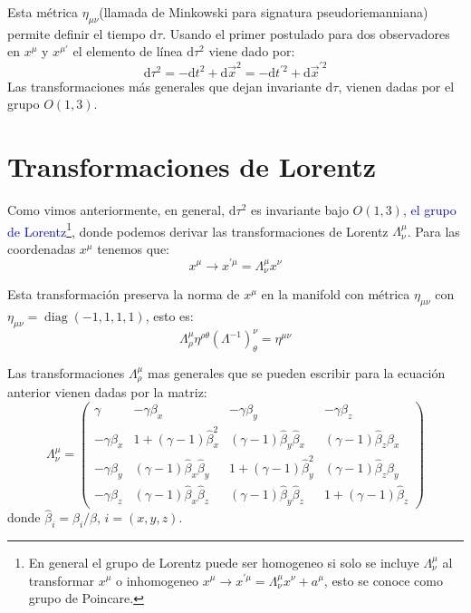 \documentclass[../main]{subfiles}
\begin{document}
\begin{adjustwidth}{0pt}{-100pt}
Esta métrica $\eta_{\mu\nu}$(llamada de Minkowski para signatura pseudoriemanniana) permite definir el tiempo $\mathrm{d}\tau$. Usando el primer postulado para dos observadores en $x^{\mu}$ y $x^{\mu'}$ el elemento de línea $\mathrm{d}\tau^2$ viene dado por:
\begin{equation}
    \mathrm{d}\tau^2=-\mathrm{d}t^2+\mathrm{d}\vec{x}^2=-\mathrm{d}t^{'2}+\mathrm{d}\vec{x}^{'2}
\end{equation}
Las transformaciones más generales que dejan invariante $\mathrm{d}\tau$, vienen dadas por el grupo $O(1, 3)$.

\section{Transformaciones de Lorentz}\label{part2.4}
Como vimos anteriormente, en general, $\mathrm{d}\tau^2$ es invariante bajo $O(1, 3)$, \textcolor{blue}{el grupo de Lorentz}\footnote{En general el grupo de Lorentz puede ser homogeneo si solo se incluye $\Lambda^{\mu}_\nu$ al transformar $x^{\mu}$ o inhomogeneo $x^{\mu} \rightarrow x^{'\mu}=\Lambda^{\mu}_{\nu}x^{\nu}+a^{\mu}$, esto se conoce como grupo de Poincare.}, donde podemos derivar las transformaciones de Lorentz $\Lambda^{\mu}_{\nu}$. Para las coordenadas $x^{\mu}$ tenemos que:
\begin{equation}
    x^{\mu} \rightarrow x^{'\mu}=\Lambda^{\mu}_{\nu} x^{\nu}
\end{equation}

Esta transformación preserva la norma de $x^{\mu}$ en la manifold con métrica $\eta_{\mu\nu}$ con $\eta_{\mu\nu}=\operatorname{diag} (-1, 1, 1, 1)$, esto es:
\begin{equation}
    \Lambda^{\mu}_{\rho} \eta^{\rho\theta}(\Lambda^{-1})^{\nu}_{\theta}=\eta^{\mu\nu}
\end{equation}

Las transformaciones $\Lambda^{\mu}_{\rho}$ mas generales que se pueden escribir para la ecuación anterior vienen dadas por la matriz:
\begin{equation}
    \Lambda^{\mu}_{\nu}=
    \begin{pmatrix}
        \gamma & -\gamma \beta_x & -\gamma \beta_y & -\gamma\beta_z \\
        -\gamma \beta_x & 1+(\gamma-1)\hat{\beta}^2_x & (\gamma-1)\hat{\beta}_y\hat{\beta}_x & (\gamma-1)\hat{\beta}_z\hat{\beta}_x \\ 
        -\gamma \beta_y & (\gamma-1)\hat{\beta}_x\hat{\beta}_y & 1+(\gamma-1)\hat{\beta}^2_y & (\gamma-1)\hat{\beta}_z\hat{\beta}_y \\
        -\gamma \beta_z & (\gamma-1)\hat{\beta}_x\hat{\beta}_z & (\gamma-1)\hat{\beta}_y\hat{\beta}_z & 1+(\gamma-1)\hat{\beta}_z
    \end{pmatrix}
\end{equation}
donde $\hat{\beta}_i=\beta_i/\beta$, $i=(x, y, z)$.


\end{adjustwidth}
\end{document}

